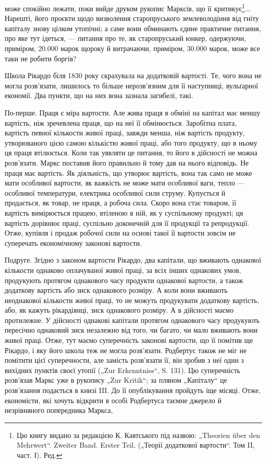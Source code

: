 \parcont{}  %
може спокійно лежати, поки вийде друком рукопис Марксів, що її критикує\footnote*{
Цю книгу видано за редакцією К. Кавтського під назвою: „Theorien über den Mehrwert“. Zweiter
Band. Erster Teil. („Теорії додаткової вартости“. Том II, част. І). Ред.
}... Нарешті, його проєкти
щодо визволення старопруського землеволодіння від гніту капіталу знову цілком утопічні; а саме вони
обминають єдине практичне питання, про яке тут ідеться, — питання про те, як старопруський юнкер,
одержуючи, приміром, 20.000 марок щороку й витрачаючи, приміром, 30.000 марок, може все таки не
робити боргів?

Школа Рікардо біля 1830 року скрахувала на додатковій вартості. Те, чого вона не могла розв’язати,
лишилось то більше нерозв’язним для її наступниці, вульґарної економії. Два пункти, що на них вона
зазнала загибелі, такі.

По-перше. Праця є міра вартости. Але жива праця в обміні на капітал має меншу вартість, ніж
зречевлена праця, що на неї її обмінюється. Заробітна плата, вартість певної кількости живої праці,
завжди менша, ніж вартість продукту, утворюваного цією самою кількістю живої праці, або того
продукту, що в ньому ця праця втілюється. Коли
так уявляти це питання, то його в дійсності не можна розв’язати. Маркс поставив його правильно й
тому дав на нього відповідь. Не праця має вартість. Як діяльність, що утворює вартість, вона так
само не може мати особливої вартости, як важкість не може мати особливої ваги, тепло — особливої
температури, електрика особливої сили струму. Купується й продається, як товар, не праця, а робоча
сила. Скоро вона стає товаром, її вартість вимірюється працею, втіленою в ній, як у суспільному
продукті; ця вартість дорівнює праці, суспільно доконечній для її продукції та репродукції. Отже,
купівля і продаж робочої сили на основі такої її вартости зовсім не суперечать економічному законові
вартости.

Подруге. Згідно з законом вартости Рікардо, два капітали, що вживають однакової кількости однаково
оплачуваної живої праці, за всіх інших однакових умов, продукують протягом однакового часу продукти
однакової вартости, а також додаткову вартість або зиск однакового розміру. А коли вони вживають
неоднакової кількости живої праці, то не можуть продукувати додаткову вартість, або, як кажуть
рікардіянці, зиск однакового розміру. А в дійсності маємо протилежне. У дійсності однакові
капітали протягом однакового часу продукують пересічно однаковий зиск незалежно від того, чи багато,
чи мало вживають вони живої праці. Отже, тут маємо суперечність законові вартости, що її помітив ще
Рікардо, і яку його школа теж не могла розв’язати. Родбертус також не міг не помітити цієї
суперечности, але замість розв’язати її, він зробив з неї один з вихідних пунктів своєї утопії („Zur
Erkenntniss“, S. 131). Цю суперечність розв’язав Маркс уже в рукопису „Zur Kritik“; за пляном
„Капіталу“ це розв’язання подається в книзі III. До її опублікування пройдуть іще місяці. Отже,
економісти, які хочуть відкрити в особі Родбертуса таємне джерело й незрівняного попередника Маркса,
\parbreak{}  %
